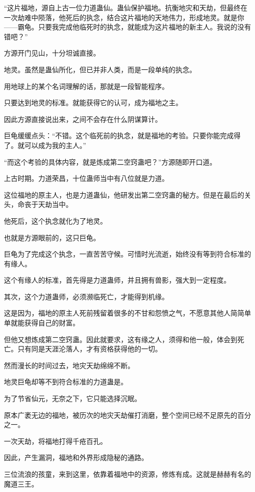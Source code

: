 \begin{this_body}
“这片福地，源自上古一位力道蛊仙。蛊仙保护福地。抗衡地灾和天劫，但最终在一次劫难中陨落，他死后的执念，结合这片福地的天地伟力，形成地灵。就是你——霸龟。只要我完成他临死时的执念，就能成为这片福地的新主人。我说的没有错吧？”

方源开门见山，十分坦诚直接。

地灵。虽然是蛊仙所化，但已并非人类，而是一段单纯的执念。

用地球上的某个名词理解的话，那就是一段智能程序。

只要达到地灵的标准。就能获得它的认可，成为福地之主。

因此方源直接说出来，之间不会存在什么阴谋算计。

巨龟缓缓点头：“不错。这个临死前的执念，就是福地的考验。只要你能完成得了。就可以成为我的主人。”

“而这个考验的具体内容，就是炼成第二空窍蛊吧？”方源随即开口道。

上古时期。力道荣昌，十位蛊师当中有八位就是力道。

这位福地的原主人，也是力道蛊仙，他研发出第二空窍蛊的秘方。但是在最后的关头，命丧于天劫当中。

他死后，这个执念就化为了地灵。

也就是方源眼前的，这只巨龟。

巨龟为了完成这个执念，一直苦苦守候。可惜时光流逝，始终没有等到符合标准的有缘人。

这个有缘人的标准，首先得是力道蛊师，并且拥有兽影，强大到一定程度。

其次，这个力道蛊师，必须濒临死亡，才能得到机缘。

这是因为，福地的原主人死前残留着很多的不甘和怨愤之气，不愿意其他人简简单单就能获得自己的财富。

但他又想炼成第二空窍蛊。因此就要求，这有缘之人，须得和他一般，体会到死亡。只有同是天涯沦落人，才有资格获得他的一切。

然而漫长的时间过去，地灾天劫绵绵不断。

地灵巨龟却等不到符合标准的力道蛊是。

为了节省仙元，无奈之下，它只能选择沉眠。

原本广袤无边的福地，被历次的地灾天劫催打消磨，整个空间已经不足原先的百分之一。

一次天劫，将福地打得千疮百孔。

因此，产生漏洞，福地和外界形成隐秘的通路。

三位流浪的孩童，来到这里，依靠着福地中的资源，修炼有成。这就是赫赫有名的魔道三王。


\end{this_body}
